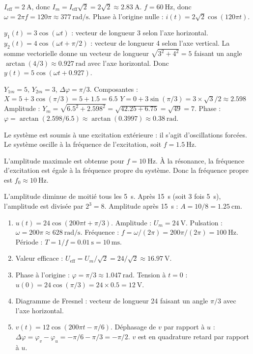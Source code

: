 $I_{\text{eff}} = \SI{2}{\ampere}$, donc $I_m = I_{\text{eff}}\sqrt{2} = 2\sqrt{2} \approx \SI{2.83}{\ampere}$.
$f = \SI{60}{\hertz}$, donc $\omega = 2\pi f = 120\pi \approx \SI{377}{\radian\per\second}$.
Phase à l'origine nulle : $i(t) = 2\sqrt{2}\cos(120\pi t)$.

$y_1(t) = 3\cos(\omega t)$ : vecteur de longueur 3 selon l'axe horizontal.
$y_2(t) = 4\cos(\omega t + \pi/2)$ : vecteur de longueur 4 selon l'axe vertical.
La somme vectorielle donne un vecteur de longueur $\sqrt{3^2 + 4^2} = 5$ faisant un angle $\arctan(4/3) \approx \SI{0.927}{\radian}$ avec l'axe horizontal.
Donc $y(t) = 5\cos(\omega t + 0.927)$.

$Y_{1m} = 5$, $Y_{2m} = 3$, $\Delta\varphi = \pi/3$.
Composantes :
$X = 5 + 3\cos(\pi/3) = 5 + 1.5 = 6.5$
$Y = 0 + 3\sin(\pi/3) = 3 \times \sqrt{3}/2 \approx 2.598$
Amplitude : $Y_m = \sqrt{6.5^2 + 2.598^2} = \sqrt{42.25 + 6.75} = \sqrt{49} = 7$.
Phase : $\varphi = \arctan(2.598/6.5) \approx \arctan(0.3997) \approx \SI{0.38}{\radian}$.

Le système est soumis à une excitation extérieure : il s'agit d'oscillations forcées.
Le système oscille à la fréquence de l'excitation, soit $f = \SI{1.5}{\hertz}$.

L'amplitude maximale est obtenue pour $f = \SI{10}{\hertz}$. À la résonance, la fréquence d'excitation est égale à la fréquence propre du système. Donc la fréquence propre est $f_0 \approx \SI{10}{\hertz}$.

L'amplitude diminue de moitié tous les \SI{5}{\second}. Après \SI{15}{\second} (soit 3 fois \SI{5}{\second}), l'amplitude est divisée par $2^3 = 8$.
Amplitude après \SI{15}{\second} : $A = 10/8 = \SI{1.25}{\centi\metre}$.

\begin{enumerate}
\item $u(t) = 24\cos(200\pi t + \pi/3)$.
Amplitude : $U_m = \SI{24}{\volt}$.
Pulsation : $\omega = 200\pi \approx \SI{628}{\radian\per\second}$.
Fréquence : $f = \omega/(2\pi) = 200\pi/(2\pi) = \SI{100}{\hertz}$.
Période : $T = 1/f = \SI{0.01}{\second} = \SI{10}{\milli\second}$.
\item Valeur efficace : $U_{\text{eff}} = U_m/\sqrt{2} = 24/\sqrt{2} \approx \SI{16.97}{\volt}$.
\item Phase à l'origine : $\varphi = \pi/3 \approx \SI{1.047}{\radian}$.
Tension à $t=0$ : $u(0) = 24\cos(\pi/3) = 24 \times 0.5 = \SI{12}{\volt}$.
\item Diagramme de Fresnel : vecteur de longueur 24 faisant un angle $\pi/3$ avec l'axe horizontal.
\item $v(t) = 12\cos(200\pi t - \pi/6)$.
Déphasage de $v$ par rapport à $u$ : $\Delta\varphi = \varphi_v - \varphi_u = -\pi/6 - \pi/3 = -\pi/2$.
$v$ est en quadrature retard par rapport à $u$.
\end{enumerate}

